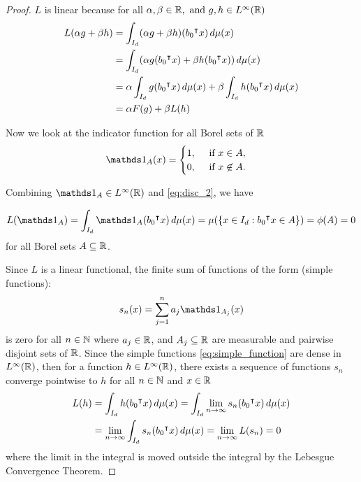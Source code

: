 \begin{proof}
    $L$ is linear because for all $\alpha, \beta \in \mathbb{R}, \text{ and } g, h \in
    L^{\infty}(\mathbb{R})$
    \begin{align*}
        L(\alpha g + \beta h)
        &= \int_{I_d} (\alpha g + \beta h) (b_0{}^{\intercal} x) \,d\mu(x) \\
        &= \int_{I_d} (\alpha g(b_0{}^{\intercal} x) + \beta h (b_0{}^{\intercal} x)) \, d\mu(x) \\
        &= \alpha \int_{I_d} g(b_0{}^{\intercal} x) \,d\mu(x) 
            + \beta \int_{I_d} h(b_0{}^{\intercal} x) \,d\mu(x) \\
        &= \alpha F(g) + \beta L(h)
    \end{align*}

    Now we look at the indicator function for all Borel sets of $\mathbb{R}$
    \begin{equation}
        \indicator{A}(x) =
        \begin{cases}
            1, \quad \text{ if } x \in A, \\
            0, \quad \text{ if } x \not\in A.
        \end{cases}
    \end{equation}

    Combining $\indicator{A} \in \lp{\infty}(\R)$ and \eqref{eq:disc_2}, we
    have 

    \begin{equation}
        L(\indicator{A}) = \int_{I_d} \indicator{A}(b_0\tr x)\,d\mu(x)
        = \mu(\{ x\in I_d: b_0\tr x\in A \}) = \phi(A) = 0
    \end{equation}
    for all Borel sets $A \subseteq \mathbb{R}$.

    Since $L$ is a linear functional, the finite sum of functions of the form
    (simple functions):
    \begin{equation}
        \label{eq:simple_function}
        s_n(x) = \sum_{j=1}^{n} a_j \indicator{A_j}(x)
    \end{equation}
    is zero for all $n\in\mathbb{N}$ where $a_j \in \mathbb{R}$, and ${A_j} \subseteq \mathbb{R}$ are
    measurable and pairwise disjoint sets of $\mathbb{R}$. Since the simple functions
    \eqref{eq:simple_function} are dense in $L^{\infty}(\mathbb{R})$, then for a
    function $h \in L^{\infty}(\mathbb{R})$, there exists a sequence of functions $s_n$
    converge pointwise to $h$ for all $n \in \mathbb{N}$ and $x \in \mathbb{R}$
    \begin{align}
        L(h) &= \int_{I_d} h(b_0{}^{\intercal} x) \,d\mu(x) 
             = \int_{I_d} \lim_{n\to\infty} s_n(b_0{}^{\intercal} x) \,d\mu(x) \\
             &= \lim_{n\to\infty} \int_{I_d} s_n(b_0{}^{\intercal} x) \,d\mu(x)
             = \lim_{n\to\infty} L(s_n)
             = 0
    \end{align}
    where the limit in the integral is moved outside the integral by the
    Lebesgue Convergence Theorem.


\end{proof}
